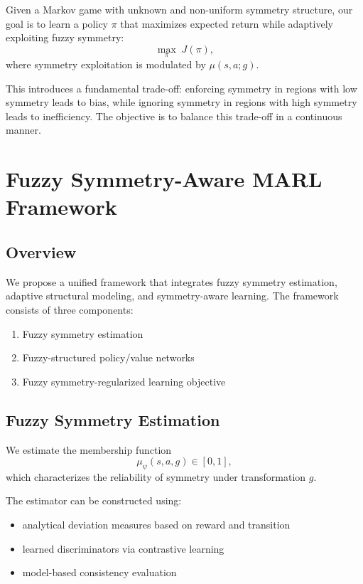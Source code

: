 Given a Markov game with unknown and non-uniform symmetry structure, our goal is to learn a policy $\pi$ that maximizes expected return while adaptively exploiting fuzzy symmetry:
\begin{equation}
\max_\pi \; J(\pi),
\end{equation}
where symmetry exploitation is modulated by $\mu(s,a;g)$.

This introduces a fundamental trade-off: enforcing symmetry in regions with low symmetry leads to bias, while ignoring symmetry in regions with high symmetry leads to inefficiency. The objective is to balance this trade-off in a continuous manner.

\section{Fuzzy Symmetry-Aware MARL Framework}

\subsection{Overview}

We propose a unified framework that integrates fuzzy symmetry estimation, adaptive structural modeling, and symmetry-aware learning. The framework consists of three components:
\begin{enumerate}
\item Fuzzy symmetry estimation
\item Fuzzy-structured policy/value networks
\item Fuzzy symmetry-regularized learning objective
\end{enumerate}

\subsection{Fuzzy Symmetry Estimation}

We estimate the membership function
\begin{equation}
\mu_\psi(s,a,g) \in [0,1],
\end{equation}
which characterizes the reliability of symmetry under transformation $g$.

The estimator can be constructed using:
\begin{itemize}
\item analytical deviation measures based on reward and transition
\item learned discriminators via contrastive learning
\item model-based consistency evaluation
\end{itemize}

